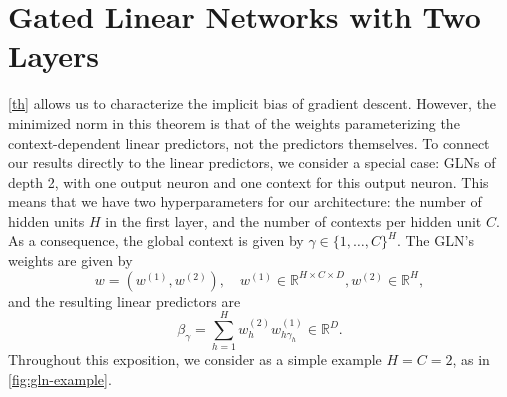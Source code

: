 \documentclass{article}
\theoremstyle{plain}
\theoremstyle{definition}
\theoremstyle{remark}
\begin{document}

\section{Gated Linear Networks with Two Layers}

\cref{th} allows us to characterize the implicit bias of gradient descent.  However, the minimized norm in this theorem is that of the weights parameterizing the context-dependent linear predictors, not the predictors themselves.  To connect our results directly to the linear predictors, we consider a special case: GLNs of depth 2, with one output neuron and one context for this output neuron. This means that we have two hyperparameters for our architecture: the number of hidden units $H$ in the first layer, and the number of contexts per hidden unit $C$.
As a consequence, the global context is given by $\gamma\in\{1,\dotsc,C\}^H$.
The GLN's weights are given by
\begin{equation}
    w=(w^{(1)},w^{(2)}),\quad
    w^{(1)}\in\mathbb{R}^{H\times C\times D},
    w^{(2)}\in\mathbb{R}^H,
\end{equation}
and the resulting linear predictors are
\begin{equation}
\label{eq:beta-param}
    \beta_{\gamma}=\sum_{h=1}^Hw^{(2)}_hw^{(1)}_{h\gamma_h}\in\mathbb{R}^D.
\end{equation}
Throughout this exposition, we consider as a simple example $H=C=2$, as in \cref{fig:gln-example}.
\end{document}
